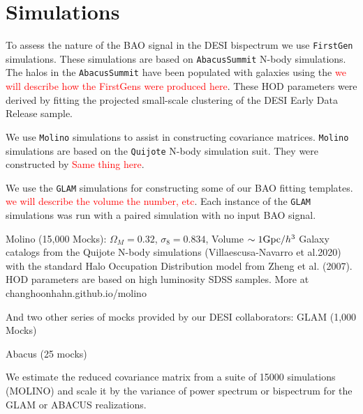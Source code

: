 \section{Simulations}
\label{sec:simulations}

To assess the nature of the BAO signal in the DESI bispectrum we use \texttt{FirstGen} simulations. These simulations are based on \texttt{AbacusSummit} N-body simulations. The halos in the \texttt{AbacusSummit} have been populated with galaxies using the \textcolor{red}{we will describe how the FirstGens were produced here}. These HOD parameters were derived by fitting the projected small-scale clustering of the DESI Early Data Release sample. 

We use \texttt{Molino} simulations to assist in constructing covariance matrices. \texttt{Molino} simulations are based on the \texttt{Quijote} N-body simulation suit. They were constructed by \textcolor{red}{Same thing here}.

We use the \texttt{GLAM} simulations for constructing some of our BAO fitting templates. \textcolor{red}{we will describe the volume the number, etc}. Each instance of the \texttt{GLAM} simulations was run with a paired simulation with no input BAO signal. 

Molino (15,000 Mocks): 
$\Omega_{M}=0.32$, $\sigma_{8}=0.834$, Volume $\sim 1 {\rm Gpc}/h^{3}$ 
Galaxy catalogs from the Quijote N-body simulations (Villaescusa-Navarro et al.2020) with the standard Halo Occupation Distribution model from Zheng et al. (2007). HOD parameters are based on high luminosity SDSS samples. More at changhoonhahn.github.io/molino

And two other series of mocks provided by our DESI collaborators:
GLAM (1,000 Mocks)

Abacus (25 mocks)


We estimate the reduced covariance matrix from a suite of 15000 simulations (MOLINO) and scale it by the variance of power spectrum or bispectrum for the GLAM or ABACUS realizations.